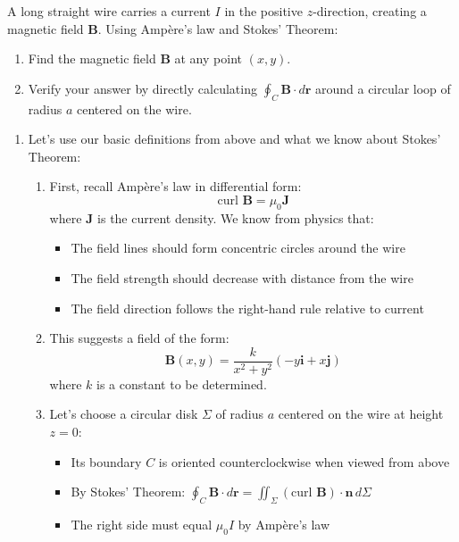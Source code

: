 \exampleline
\begin{example}
A long straight wire carries a current $I$ in the positive $z$-direction, creating a magnetic field $\mathbf{B}$. Using Ampère's law and Stokes' Theorem:
\begin{enumerate}
    \item Find the magnetic field $\mathbf{B}$ at any point $(x,y)$.
    \item Verify your answer by directly calculating $\oint_C \mathbf{B} \cdot d\mathbf{r}$ around a circular loop of radius $a$ centered on the wire.
\end{enumerate}

\begin{solution}
\begin{enumerate}
\item Let's use our basic definitions from above and what we know about Stokes' Theorem:
\begin{enumerate}
\item First, recall Ampère's law in differential form:
   \[
   \text{curl }\mathbf{B} = \mu_0\mathbf{J}
   \]
   where $\mathbf{J}$ is the current density. We know from physics that:
   \begin{itemize}
       \item The field lines should form concentric circles around the wire
       \item The field strength should decrease with distance from the wire
       \item The field direction follows the right-hand rule relative to current
   \end{itemize}

\item This suggests a field of the form:
   \[
   \mathbf{B}(x,y) = \frac{k}{x^2 + y^2}\left(-y\mathbf{i} + x\mathbf{j}\right)
   \]
   where $k$ is a constant to be determined.

\item Let's choose a circular disk $\Sigma$ of radius $a$ centered on the wire at height $z=0$:
   \begin{itemize}
       \item Its boundary $C$ is oriented counterclockwise when viewed from above
       \item By Stokes' Theorem: $\oint_C \mathbf{B} \cdot d\mathbf{r} = \iint_\Sigma (\text{curl }\mathbf{B}) \cdot \mathbf{n}\,d\Sigma$
       \item The right side must equal $\mu_0 I$ by Ampère's law
   \end{itemize}
\end{enumerate}


\end{enumerate}
\end{solution}
\end{example}
